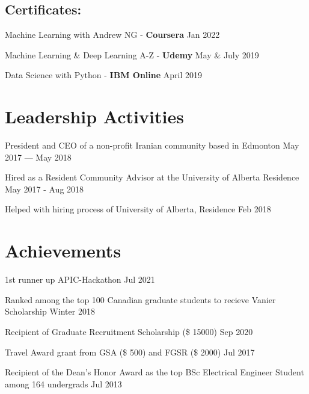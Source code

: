 \documentclass[letter,11pt]{article}
\begin{document}
\subsection{Certificates:}
\begin{zitemize}
	\item Machine Learning with Andrew NG - \textbf{Coursera} \hfill Jan 2022
	\item Machine Learning \& Deep Learning A-Z - \textbf{Udemy} \hfill May \& July 2019
	\item Data Science with Python - \textbf{IBM Online} \hfill April 2019
\end{zitemize}



\section{Leadership Activities}
\begin{zitemize}
	\item President and CEO of a non-profit Iranian community based in Edmonton \hfill May 2017 --- May 2018
	\item Hired as a Resident Community Advisor at the University of Alberta Residence \hfill May 2017 - Aug 2018
	\item Helped with hiring process of University of Alberta, Residence \hfill Feb 2018
\end{zitemize}

\section{Achievements}
\begin{zitemize}
	\item 1st runner up APIC-Hackathon	\hfill Jul 2021
	\item Ranked among the top 100 Canadian graduate students to recieve Vanier Scholarship	\hfill Winter 2018
	\item Recipient of Graduate Recruitment Scholarship (\$ 15000) \hfill Sep 2020
	\item Travel Award grant from GSA (\$ 500) and FGSR (\$ 2000) \hfill Jul 2017
	\item Recipient of the Dean's Honor Award as the top BSc Electrical Engineer Student among 164 undergrads \hfill Jul 2013
\end{zitemize}







\end{document}
